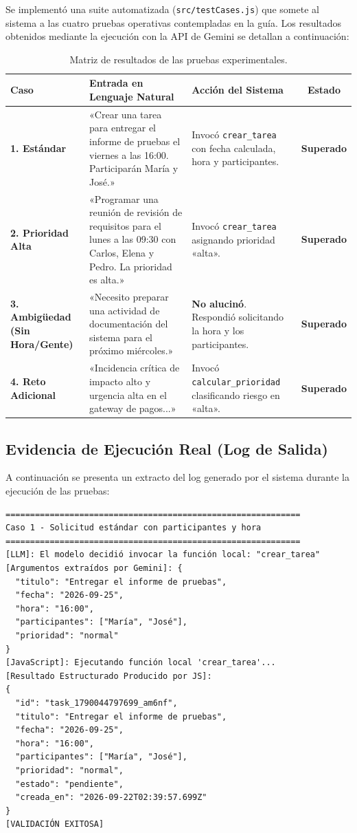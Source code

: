 \documentclass[11pt,a4paper]{article}
\begin{document}
Se implementó una suite automatizada (\texttt{src/testCases.js}) que somete al sistema a las cuatro pruebas operativas contempladas en la guía. Los resultados obtenidos mediante la ejecución con la API de Gemini se detallan a continuación:

\begin{table}[h!]
\centering
\small
\begin{tabular}{@{}lp{5.8cm}p{4.2cm}c@{}}
\toprule
\textbf{Caso} & \textbf{Entrada en Lenguaje Natural} & \textbf{Acción del Sistema} & \textbf{Estado} \\
\midrule
\textbf{1. Estándar} & «Crear una tarea para entregar el informe de pruebas el viernes a las 16:00. Participarán María y José.» & Invocó \texttt{crear\_tarea} con fecha calculada, hora y participantes. & \textbf{Superado} \\
\midrule
\textbf{2. Prioridad Alta} & «Programar una reunión de revisión de requisitos para el lunes a las 09:30 con Carlos, Elena y Pedro. La prioridad es alta.» & Invocó \texttt{crear\_tarea} asignando prioridad «alta». & \textbf{Superado} \\
\midrule
\textbf{3. Ambigüedad (Sin Hora/Gente)} & «Necesito preparar una actividad de documentación del sistema para el próximo miércoles.» & \textbf{No alucinó}. Respondió solicitando la hora y los participantes. & \textbf{Superado} \\
\midrule
\textbf{4. Reto Adicional} & «Incidencia crítica de impacto alto y urgencia alta en el gateway de pagos...» & Invocó \texttt{calcular\_prioridad} clasificando riesgo en «alta». & \textbf{Superado} \\
\bottomrule
\end{tabular}
\caption{Matriz de resultados de las pruebas experimentales.}
\label{tab:casos}
\end{table}

\subsection{Evidencia de Ejecución Real (Log de Salida)}
A continuación se presenta un extracto del log generado por el sistema durante la ejecución de las pruebas:

\begin{lstlisting}[basicstyle=\ttfamily\scriptsize, caption={Salida de la ejecución de casos de prueba}]
============================================================
Caso 1 - Solicitud estándar con participantes y hora
============================================================
[LLM]: El modelo decidió invocar la función local: "crear_tarea"
[Argumentos extraídos por Gemini]: {
  "titulo": "Entregar el informe de pruebas",
  "fecha": "2026-09-25",
  "hora": "16:00",
  "participantes": ["María", "José"],
  "prioridad": "normal"
}
[JavaScript]: Ejecutando función local 'crear_tarea'...
[Resultado Estructurado Producido por JS]:
{
  "id": "task_1790044797699_am6nf",
  "titulo": "Entregar el informe de pruebas",
  "fecha": "2026-09-25",
  "hora": "16:00",
  "participantes": ["María", "José"],
  "prioridad": "normal",
  "estado": "pendiente",
  "creada_en": "2026-09-22T02:39:57.699Z"
}
[VALIDACIÓN EXITOSA]
\end{lstlisting}
\end{document}
